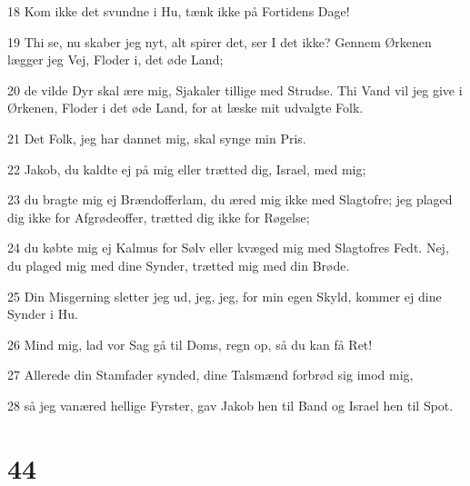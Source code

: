\par 18 Kom ikke det svundne i Hu, tænk ikke på Fortidens Dage!
\par 19 Thi se, nu skaber jeg nyt, alt spirer det, ser I det ikke? Gennem Ørkenen lægger jeg Vej, Floder i, det øde Land;
\par 20 de vilde Dyr skal ære mig, Sjakaler tillige med Strudse. Thi Vand vil jeg give i Ørkenen, Floder i det øde Land, for at læske mit udvalgte Folk.
\par 21 Det Folk, jeg har dannet mig, skal synge min Pris.
\par 22 Jakob, du kaldte ej på mig eller trætted dig, Israel, med mig;
\par 23 du bragte mig ej Brændofferlam, du æred mig ikke med Slagtofre; jeg plaged dig ikke for Afgrødeoffer, trætted dig ikke for Røgelse;
\par 24 du købte mig ej Kalmus for Sølv eller kvæged mig med Slagtofres Fedt. Nej, du plaged mig med dine Synder, trætted mig med din Brøde.
\par 25 Din Misgerning sletter jeg ud, jeg, jeg, for min egen Skyld, kommer ej dine Synder i Hu.
\par 26 Mind mig, lad vor Sag gå til Doms, regn op, så du kan få Ret!
\par 27 Allerede din Stamfader synded, dine Talsmænd forbrød sig imod mig,
\par 28 så jeg vanæred hellige Fyrster, gav Jakob hen til Band og Israel hen til Spot.

\chapter{44}

